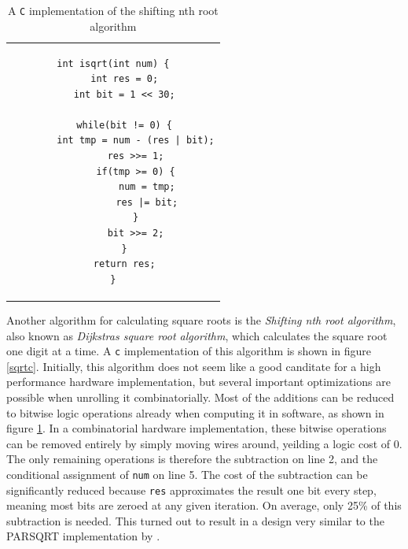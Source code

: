 			\begin{table}
				\centering
				\caption{A \texttt{C} implementation of the shifting nth root 
					algorithm}
				\label{sqrtcopt}
				\begin{tabular}{c}
				\begin{lstlisting}
int isqrt(int num) {
    int res = 0;
    int bit = 1 << 30;

    while(bit != 0) {
    	int tmp = num - (res | bit);
    	res >>= 1;
        if(tmp >= 0) {
            num = tmp;
            res |= bit;
        }
        bit >>= 2;
    }
    return res;
}
				\end{lstlisting}
				\end{tabular}
			\end{table}

			Another algorithm for calculating square roots is the
			\emph{Shifting nth root algorithm}, also known as \emph{Dijkstras
			square root algorithm}, which calculates the square root one digit
			at a time. A \texttt{c} implementation of this algorithm is shown
			in figure \ref{sqrtc}. Initially, this algorithm does not seem like
			a good canditate for a high performance hardware implementation,
			but several important optimizations are possible when unrolling it
			combinatorially. Most of the additions can be reduced to bitwise
			logic operations already when computing it in software, as shown in
			figure \ref{sqrtcopt}. In a combinatorial hardware implementation,
			these bitwise operations can be removed entirely by simply moving
			wires around, yeilding a logic cost of 0. The only remaining
			operations is therefore the subtraction on line 2, and the
			conditional assignment of \texttt{num} on line 5. The cost of the
			subtraction can be significantly reduced because \texttt{res}
			approximates the result one bit every step, meaning most bits are
			zeroed at any given iteration. On average, only 25\% of this
			subtraction is needed. This turned out to result in a design very
			similar to the PARSQRT implementation by \cite{japaneseSQRT}.
